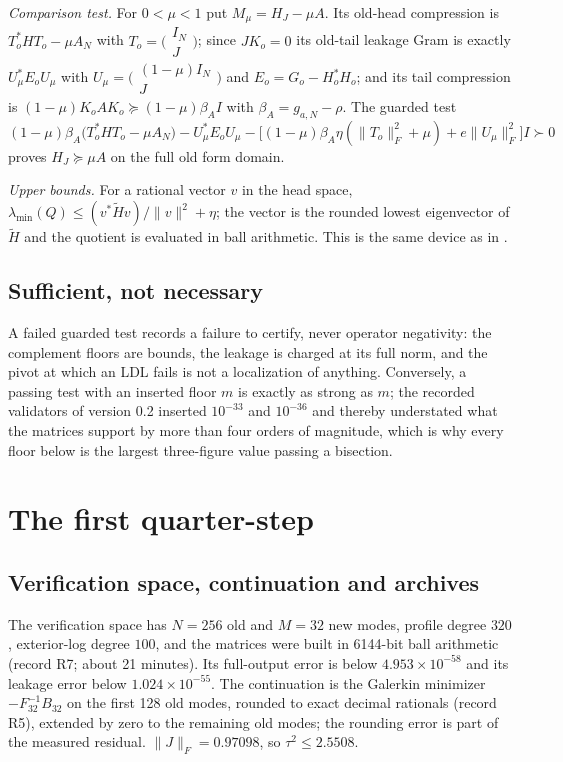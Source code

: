 \documentclass[11pt]{article}
\numberwithin{equation}{section}
\theoremstyle{definition}
\theoremstyle{remark}
\newcommand{\norm}[1]{\lVert#1\rVert}
\begin{document}
\emph{Comparison test.} For $0<\mu<1$ put $M_\mu=H_J-\mu A$. Its old-head compression is $T_o^*HT_o-\mu A_N$ with $T_o=\bigl(\begin{smallmatrix}I_N\\J\end{smallmatrix}\bigr)$; since $JK_o=0$ its old-tail leakage Gram is exactly $U_\mu^*E_oU_\mu$ with $U_\mu=\bigl(\begin{smallmatrix}(1-\mu)I_N\\J\end{smallmatrix}\bigr)$ and $E_o=G_o-H_o^*H_o$; and its tail compression is $(1-\mu)K_oAK_o\succeq(1-\mu)\beta_AI$ with $\beta_A=g_{a,N}-\rho$. The guarded test
\begin{equation}\label{eq:mu-schur}
 (1-\mu)\beta_A\bigl(T_o^*HT_o-\mu A_N\bigr)-U_\mu^*E_oU_\mu-\bigl[(1-\mu)\beta_A\eta(\norm{T_o}_F^2+\mu)+e\norm{U_\mu}_F^2\bigr]I\succ0
\end{equation}
proves $H_J\succeq\mu A$ on the full old form domain.

\emph{Upper bounds.} For a rational vector $v$ in the head space, $\lambda_{\min}(Q)\le(v^*\widetilde Hv)/\norm v^2+\eta$; the vector is the rounded lowest eigenvector of $\widetilde H$ and the quotient is evaluated in ball arithmetic. This is the same device as in \cite{WeilDepth}.

\subsection{Sufficient, not necessary}
A failed guarded test records a failure to certify, never operator negativity: the complement floors are bounds, the leakage is charged at its full norm, and the pivot at which an LDL fails is not a localization of anything. Conversely, a passing test with an inserted floor $m$ is exactly as strong as $m$; the recorded validators of version 0.2 inserted $10^{-33}$ and $10^{-36}$ and thereby understated what the matrices support by more than four orders of magnitude, which is why every floor below is the largest three-figure value passing a bisection.

\section{The first quarter-step}\label{sec:first}

\subsection{Verification space, continuation and archives}
The verification space has $N=256$ old and $M=32$ new modes, profile degree $320$, exterior-log degree $100$, and the matrices were built in 6144-bit ball arithmetic (record R7; about 21 minutes). Its full-output error is below $4.953\times10^{-58}$ and its leakage error below $1.024\times10^{-55}$. The continuation is the Galerkin minimizer $-F_{32}^{-1}B_{32}$ on the first 128 old modes, rounded to exact decimal rationals (record R5), extended by zero to the remaining old modes; the rounding error is part of the measured residual. $\norm J_F=0.97098$, so $\tau^2\le2.5508$.
\end{document}
